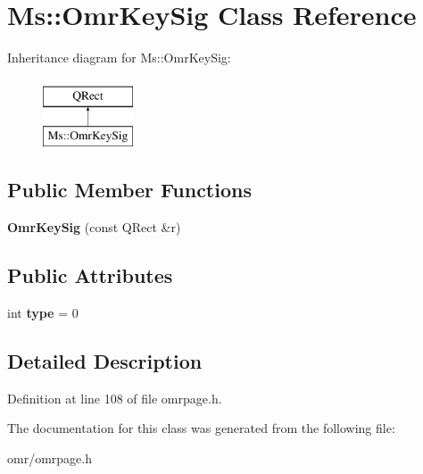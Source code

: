 \hypertarget{class_ms_1_1_omr_key_sig}{}\section{Ms\+:\+:Omr\+Key\+Sig Class Reference}
\label{class_ms_1_1_omr_key_sig}
Inheritance diagram for Ms\+:\+:Omr\+Key\+Sig\+:\begin{figure}[H]
\begin{center}
\leavevmode
\includegraphics[height=2.000000cm]{class_ms_1_1_omr_key_sig}
\end{center}
\end{figure}
\subsection*{Public Member Functions}
\begin{DoxyCompactItemize}
\item 
\mbox{\label{class_ms_1_1_omr_key_sig_ae63bcb16e2d89d7c2d7833d0802db89a}} 
{\bfseries Omr\+Key\+Sig} (const Q\+Rect \&r)
\end{DoxyCompactItemize}
\subsection*{Public Attributes}
\begin{DoxyCompactItemize}
\item 
\mbox{\label{class_ms_1_1_omr_key_sig_afafdd1994b197f604373d203a5cc9df3}} 
int {\bfseries type} = 0
\end{DoxyCompactItemize}


\subsection{Detailed Description}


Definition at line 108 of file omrpage.\+h.



The documentation for this class was generated from the following file\+:\begin{DoxyCompactItemize}
\item 
omr/omrpage.\+h\end{DoxyCompactItemize}
